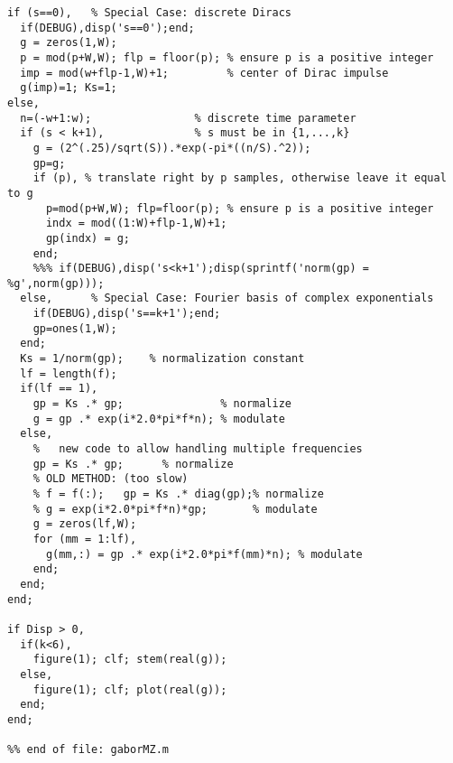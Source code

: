 \begin{small}
\begin{verbatim}
if (s==0),   % Special Case: discrete Diracs
  if(DEBUG),disp('s==0');end;
  g = zeros(1,W);  
  p = mod(p+W,W); flp = floor(p); % ensure p is a positive integer
  imp = mod(w+flp-1,W)+1;         % center of Dirac impulse
  g(imp)=1; Ks=1;
else,
  n=(-w+1:w);                % discrete time parameter
  if (s < k+1),              % s must be in {1,...,k}
    g = (2^(.25)/sqrt(S)).*exp(-pi*((n/S).^2));
    gp=g;
    if (p), % translate right by p samples, otherwise leave it equal to g
      p=mod(p+W,W); flp=floor(p); % ensure p is a positive integer  
      indx = mod((1:W)+flp-1,W)+1;
      gp(indx) = g;
    end; 
    %%% if(DEBUG),disp('s<k+1');disp(sprintf('norm(gp) = %g',norm(gp)));
  else,      % Special Case: Fourier basis of complex exponentials
    if(DEBUG),disp('s==k+1');end;
    gp=ones(1,W);
  end;
  Ks = 1/norm(gp);    % normalization constant
  lf = length(f);
  if(lf == 1),  
    gp = Ks .* gp;               % normalize
    g = gp .* exp(i*2.0*pi*f*n); % modulate
  else,
    %   new code to allow handling multiple frequencies
    gp = Ks .* gp;      % normalize
    % OLD METHOD: (too slow)
    % f = f(:);   gp = Ks .* diag(gp);% normalize
    % g = exp(i*2.0*pi*f*n)*gp;       % modulate
    g = zeros(lf,W);
    for (mm = 1:lf),
      g(mm,:) = gp .* exp(i*2.0*pi*f(mm)*n); % modulate
    end;
  end;
end;

if Disp > 0,
  if(k<6), 
    figure(1); clf; stem(real(g)); 
  else,
    figure(1); clf; plot(real(g)); 
  end;
end;

%% end of file: gaborMZ.m
\end{verbatim}   \end{small}

